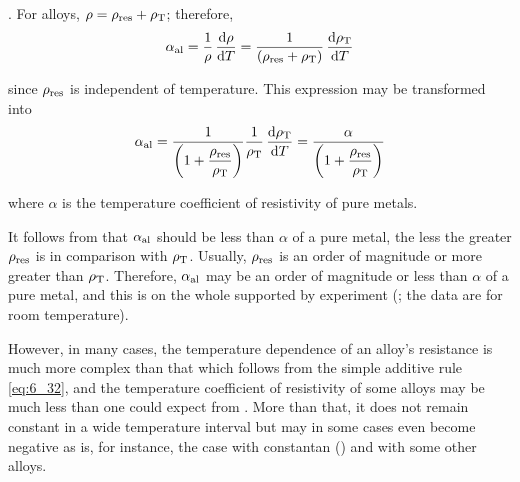 . For alloys, $\rho=\rho_{\text{res}}+\rho_{\text{T}}$; therefore,
\begin{equation*}
	\alpha_{\text{al}} = \frac{1}{\rho}\, \dfrac{\mathrm{d}\rho}{\mathrm{d} T} = \frac{1}{\left(\rho_{\text{res}}+\rho_{\text{T}}\right)}\, \dfrac{\mathrm{d}\rho_{\text{T}}}{\mathrm{d} T}
\end{equation*}

\noindent
since $\rho_{\text{res}}$ is independent of temperature. This expression may be transformed into
\begin{equation}\label{eq:6_34}
	\alpha_{\text{al}} = \frac{1}{\left(1 + \dfrac{\rho_{\text{res}}}{\rho_{\text{T}}}\right)} \frac{1}{\rho_{\text{T}}}\, \dfrac{\mathrm{d}\rho_{\text{T}}}{\mathrm{d} T} = \frac{\alpha}{\left(1 + \dfrac{\rho_{\text{res}}}{\rho_{\text{T}}}\right)}
\end{equation}

\noindent
where $\alpha$ is the temperature coefficient of resistivity of pure metals.

It follows from  that $\alpha_{\text{al}}$ should be less than $\alpha$ of a pure metal, the less the greater $\rho_{\text{res}}$ is in comparison with $\rho_{\text{T}}$. Usually, $\rho_{\text{res}}$ is an order of magnitude or more greater than $\rho_{\text{T}}$. Therefore, $\alpha_{\text{al}}$ may be an order of magnitude or less than $\alpha$ of a pure metal, and this is on the whole supported by experiment (; the data are for room temperature).

\begin{table}[!b]
	\renewcommand{\arraystretch}{1.2}
	\caption{}
	\vspace{-0.6cm}
	\label{table:6_4}
	\begin{center}\end{center}
\end{table}

However, in many cases, the temperature dependence of an alloy's resistance is much more complex than that which follows from the simple additive rule \eqref{eq:6_32}, and the temperature coefficient of resistivity of some alloys may be much less than one could expect from . More than that, it does not remain constant in a wide temperature interval but may in some cases even become negative as is, for instance, the case with constantan () and with some other alloys.

